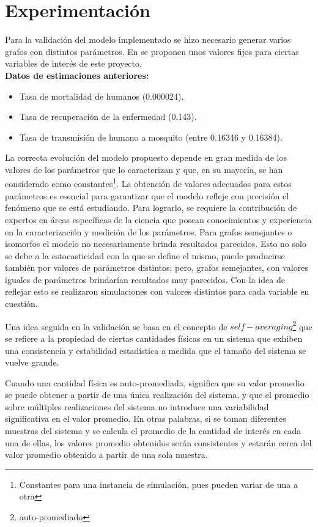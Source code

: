 \section{Experimentación}
Para la validación del modelo implementado se hizo necesario generar varios grafos con distintos parámetros.
En \autocite{Arazoza2010} se proponen unos valores fijos para ciertas variables de interés de este proyecto.\\

\textbf{Datos de estimaciones anteriores:}\autocite{Arazoza2010}
\begin{itemize}
    \item Tasa de mortalidad de humanos (0.000024).
    \item Tasa de recuperación de la enfermedad (0.143).
    \item Tasa de transmisión de humano a mosquito (entre 0.16346 y 0.16384).
\end{itemize}

La correcta evolución del modelo propuesto depende en gran medida de los valores de los parámetros que lo  
caracterizan y que, en su mayoría, se han considerado como constantes\footnote{Constantes para una 
instancia de simulación, pues pueden variar de una a otra}. La obtención de valores 
adecuados para estos parámetros es esencial para garantizar que el modelo refleje con precisión el 
fenómeno que se está estudiando. Para lograrlo, se requiere la contribución de expertos en áreas específicas 
de la ciencia que posean conocimientos y experiencia en la caracterización y medición de los parámetros.
Para grafos semejantes o isomorfos el modelo no necesariamente brinda resultados parecidos. Esto no solo 
se debe a la estocasticidad con la que se define el mismo, puede producirse también por valores de 
parámetros distintos; pero, grafos semejantes, con valores iguales de parámetros brindarían 
resultados muy parecidos. Con la idea de reflejar esto se realizaron simulaciones con valores distintos
para cada variable en cuestión.

Una idea seguida en la validación se basa en el concepto de $self-averaging$\footnote{auto-promediado} que se refiere a la propiedad de 
ciertas cantidades físicas en un sistema que exhiben una consistencia y estabilidad estadística a medida 
que el tamaño del sistema se vuelve grande. \

Cuando una cantidad física es auto-promediada, significa que su valor promedio se puede 
obtener a partir de una única realización del sistema, y que el promedio sobre múltiples 
realizaciones del sistema no introduce una variabilidad significativa en el valor promedio. 
En otras palabras, si se toman diferentes muestras del sistema y se calcula el promedio de 
la cantidad de interés en cada una de ellas, los valores promedio obtenidos serán 
consistentes y estarán cerca del valor promedio obtenido a partir de una sola muestra.

